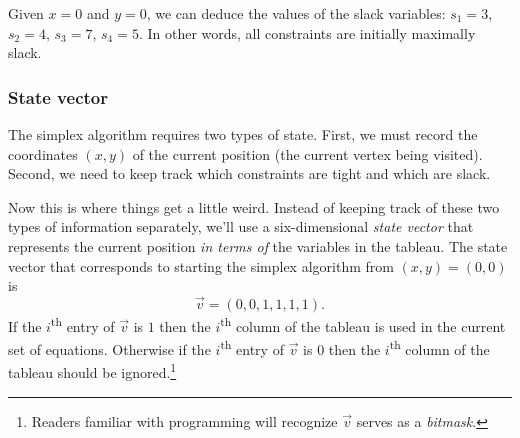 \documentclass[11pt,oneside]{article}
\begin{document}
		Given $x=0$ and $y=0$, we can deduce the values of the slack variables: 
		$s_1=3$, $s_2=4$, $s_3=7$, $s_4=5$.
		In other words, all constraints are initially maximally slack.
		
	\subsubsection{State vector}

		The simplex algorithm requires two types of state.
		First, we must record the coordinates $(x,y)$ of the current position (the current vertex being visited).
		Second, we need to keep track which constraints are tight and which are slack.
		
		Now this is where things get a little weird.
		Instead of keeping track of these two types of information separately,
		we'll use a six-dimensional \emph{state vector} that represents the current position \emph{in terms of} the variables in the tableau.
		The state vector that corresponds to starting the simplex algorithm from $(x,y)=(0,0)$ is
		\[
		   \vec{v} = (0,0, 1, 1, 1, 1 ).
		\]
		If the $i$\textsuperscript{th} entry of $\vec{v}$ is $1$ then the $i$\textsuperscript{th} column of the tableau is used in the current set of equations.
		Otherwise if the $i$\textsuperscript{th} entry of $\vec{v}$ is $0$ then the $i$\textsuperscript{th} column of the tableau
		should be ignored.\!\footnote{Readers familiar with programming will recognize $\vec{v}$ serves as a \emph{bitmask}.}
		
\end{document}
